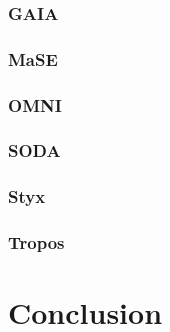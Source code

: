 \documentclass{article}
\begin{document}
\subsubsection{GAIA}
\subsubsection{MaSE}
\subsubsection{OMNI}
\subsubsection{SODA}
\subsubsection{Styx}
\subsubsection{Tropos}

\section{Conclusion}



\end{document}
